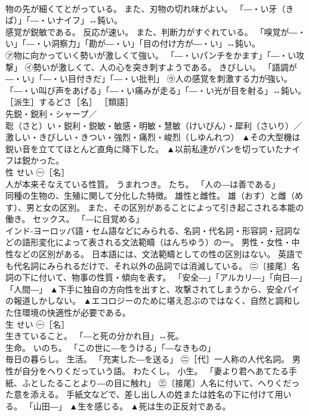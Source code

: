 \documentclass[8pt]{extreport}
\begin{document}
\begin{CJK}{UTF8}{min}
\\	物の先が細くてとがっている。 また、刃物の切れ味がよい。 「―・い牙（きば）」「―・いナイフ」↔鈍い。 
\\	感覚が鋭敏である。 反応が速い。 また、判断力がすぐれている。 「嗅覚が―・い」「―・い洞察力」「勘が―・い」「目の付け方が―・い」↔鈍い。 
\\	㋐物に向かっていく勢いが激しくて強い。 「―・いパンチをかます」「―・い攻撃」 ㋑勢いが激しくて、人の心を突き刺すようである。 きびしい。 「語調が―・い」「―・い目付きだ」「―・い批判」 ㋒人の感覚を刺激する力が強い。 「―・い叫び声をあげる」「―・い痛みが走る」「―・い光が目を射る」↔鈍い。 ［派生］するどさ［名］ ［類語］
\\	先鋭・鋭利・シャープ／
\\	聡（さと）い・鋭利・鋭敏・敏感・明敏・慧敏（けいびん）・犀利（さいり）／
\\	激しい・きびしい・きつい・強烈・痛烈・峻烈（しゆんれつ）	▲その大型機は鋭い音を立ててほとんど直角に降下した。 ▲以前私達がパンを切っていたナイフは鋭かった。
\\	性	せい	㊀［名］ 
\\	人が本来そなえている性質。 うまれつき。 たち。 「人の―は善である」 
\\	同種の生物の、生殖に関して分化した特徴。 雄性と雌性。 雄（おす）と雌（めす）、男と女の区別。 また、その区別があることによって引き起こされる本能の働き。 セックス。 「―に目覚める」 
\\	インド‐ヨーロッパ語・セム語などにみられる、名詞・代名詞・形容詞・冠詞などの語形変化によって表される文法範疇（はんちゆう）の一。 男性・女性・中性などの区別がある。 日本語には、文法範疇としての性の区別はない。 英語でも代名詞にみられるだけで、それ以外の品詞では消滅している。 ㊁〔接尾〕名詞の下に付いて、物事の性質・傾向を表す。 「安全―」「アルカリ―」「向日―」「人間―」	▲下手に独自の方向性を出すと、攻撃されてしまうから、安全パイの報道しかしない。 ▲エコロジーのために堪え忍ぶのではなく、自然と調和した住環境の快適性が必要である。
\\	生	せい	㊀［名］ 
\\	生きていること。 「―と死の分かれ目」↔死。 
\\	生命。 いのち。 「この世に―をうける」「―なきもの」 
\\	毎日の暮らし。 生活。 「充実した―を送る」 ㊁［代］一人称の人代名詞。 男性が自分をへりくだっていう語。 わたくし。 小生。 「妻より君へあてたる手紙、ふとしたることより―の目に触れ」 ㊂〔接尾〕人名に付いて、へりくだった意を添える。 手紙文などで、差し出し人の姓または姓名の下に付けて用いる。 「山田―」	▲生を感じる。 ▲死は生の正反対である。

\end{CJK}
\end{document}
